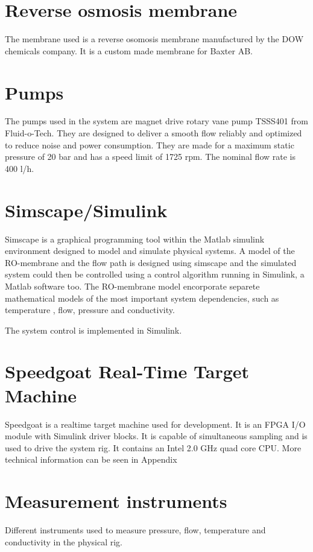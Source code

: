 
\section{Reverse osmosis membrane}
The membrane used is a reverse osomosis membrane manufactured by the DOW chemicals company. It is a custom made membrane for Baxter AB. 

\section{Pumps}
The pumps used in the system are magnet drive rotary vane pump TSSS401 from Fluid-o-Tech. They are designed to deliver a smooth flow reliably and optimized to reduce noise and power consumption. They are made for a maximum static pressure of 20 bar and has a speed limit of 1725 rpm. The nominal flow rate is 400 l/h. 

\section{Simscape/Simulink}\label{Simscape}

Simscape is a graphical programming tool within the Matlab simulink environment designed to model and simulate physical systems. A model of the RO-membrane and the flow path is designed using simscape and the simulated system could then be controlled using a control algorithm running in Simulink, a Matlab software too. The RO-membrane model encorporate separete mathematical models of the most important system dependencies, such as temperature , flow, pressure and conductivity.  

The system control is implemented in Simulink. 


\section{Speedgoat Real-Time Target Machine}
Speedgoat is a realtime target machine used for development. It is an FPGA I/O module with Simulink driver blocks. It is capable of simultaneous sampling and is used to drive the system rig. It contains an Intel 2.0 GHz quad core CPU. More technical information can be seen in Appendix 


\section{Measurement instruments}
Different instruments used to measure pressure, flow, temperature and conductivity in the physical rig.

